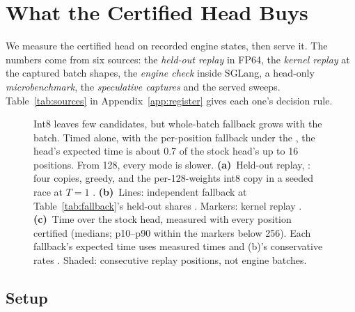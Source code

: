 \section{What the Certified Head Buys}\label{sec:measure}
We measure the certified head on recorded engine states, then serve it. The numbers come from six sources: the \emph{held-out replay} in FP64, the \emph{kernel replay} at the captured batch shapes, the \emph{engine check} inside SGLang, a head-only \emph{microbenchmark}, the \emph{speculative captures} and the served sweeps. Table~\ref{tab:sources} in Appendix~\ref{app:register} gives each one's decision rule.

\begin{figure}[t]
\centering
%
\caption{Int8 leaves few candidates, but whole-batch fallback grows with the batch. Timed alone, with the per-position fallback under the \modelcons{}, the head's expected time is about 0.7 of the stock head's up to 16 positions. From 128, every mode is slower. \textbf{(a)}~Held-out replay, \Rreal{}: four copies, greedy, and the per-128-weights int8 copy in a seeded race at $T=1$ . \textbf{(b)}~Lines: independent fallback at Table~\ref{tab:fallback}'s held-out shares . Markers: kernel replay . \textbf{(c)}~Time over the stock head, measured with every position certified (medians; p10--p90 within the markers below 256). Each fallback's expected time uses measured times and (b)'s conservative rates . Shaded: consecutive replay positions, not engine batches.}
\label{fig:candidates}\label{fig:geometry-candidates}
\end{figure}

\subsection{Setup}\label{sec:setup}\label{sec:transport-capture}
